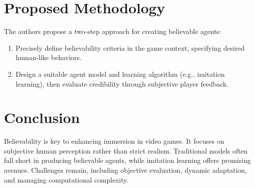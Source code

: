 \documentclass[a4paper,11pt]{article}
\begin{document}
\section{Proposed Methodology}

The authors propose a two-step approach for creating believable agents:

\begin{enumerate}
    \item Precisely define believability criteria in the game context, specifying desired human-like behaviors.
    \item Design a suitable agent model and learning algorithm (e.g., imitation learning), then evaluate credibility through subjective player feedback.
\end{enumerate}

\section{Conclusion}

Believability is key to enhancing immersion in video games. It focuses on subjective human perception rather than strict realism. Traditional models often fall short in producing believable agents, while imitation learning offers promising avenues. Challenges remain, including objective evaluation, dynamic adaptation, and managing computational complexity.
\end{document}
